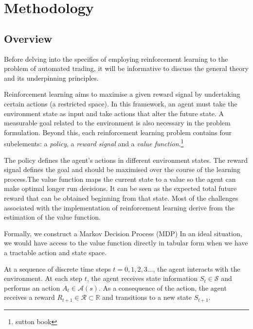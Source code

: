 \documentclass[12pt]{article}
\title{}
\author{}
\begin{document}
\maketitle



\section{Methodology}
\subsection{Overview}
Before delving into the specifics of employing reinforcement learning to the problem of automated trading, it will be informative to discuss the general theory and its underpinning principles. 

Reinforcement learning aims to maximise a given reward signal by undertaking certain actions (a restricted space). In this framework, an agent must take the environment state as input and take actions that alter the future state. A measurable goal related to the environment is also necessary in the problem formulation. Beyond this, each reinforcement learning problem contains four subelements: a \textit{policy}, a \textit{reward signal} and a \textit{value function}.\footnote{sutton book }

The policy defines the agent's actions in different environment states. The reward signal defines the goal and should be maximised over the course of the learning process.The value function maps the current state to a value so the agent can make optimal longer run decisions. It can be seen as the expected total future reward that can be obtained beginning from that state. Most of the challenges associated with the implementation of reinforcement learning derive from the estimation of the value function.

Formally, we construct a Markov Decision Process (MDP)
In an ideal situation, we would have access to the value function directly in tabular form when we have a tractable action and state space.

At a sequence of discrete time steps $t = 0,1,2,3...$, the agent interacts with the environment. At each step $t$, the agent receives state information $S _ { t } \in \mathcal{S}$ and performs an action $A _ { t } \in \mathcal { A } ( s )$. As a consequence of the action, the agent receives a reward $R _ { t + 1 } \in \mathcal { R } \subset \mathbb { R }$ and transitions to a new state $S _ { t + 1 }$.
\end{document}
